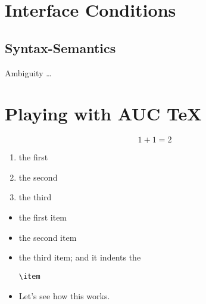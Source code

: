 \documentclass{article}
\begin{document}
\section{Interface Conditions}
\subsection{Syntax-Semantics}
Ambiguity \ldots


\section{Playing with AUC TeX}
\begin{equation}
    1 + 1 = 2
\end{equation}
        
\begin{enumerate}
  \item the first 
    \item the second
      \item the third
\end{enumerate}

\begin{itemize}
  \item the first item
    \item the second item
      \item the third item; and it indents the
\begin{verbatim}
\item
\end{verbatim}
        \item Let's see how this works.
\end{itemize}
\end{document}
